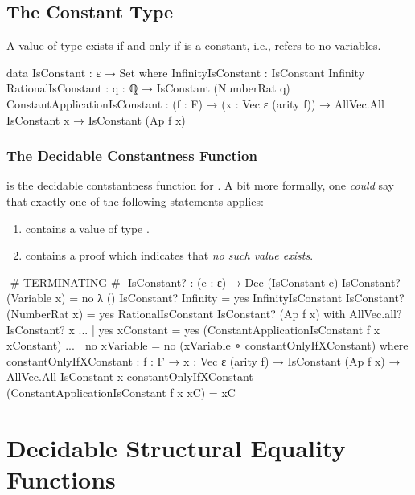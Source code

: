 \documentclass{report}
\begin{document}
\section{The Constant Type}
A value of type   exists if and only if  is a constant, i.e., refers to no variables.

\begin{code}
  data IsConstant : ε → Set where
    InfinityIsConstant : IsConstant Infinity
    RationalIsConstant : {q : ℚ} → IsConstant (NumberRat q)
    ConstantApplicationIsConstant :
      (f : F) →
      (x : Vec ε (arity f)) →
      AllVec.All IsConstant x →
      IsConstant (Ap f x)
\end{code}

\subsection{The Decidable Constantness Function}
 is the decidable contstantness function for .  A bit more formally, one \emph{could} say that exactly one of the following statements applies:

\begin{enumerate}
  \item {}  contains a value of type  .
  \item {}  contains a proof which indicates that \emph{no such value exists}.
\end{enumerate}

\begin{code}
  {-# TERMINATING #-}
  IsConstant? : (e : ε) → Dec (IsConstant e)
  IsConstant? (Variable x) = no λ ()
  IsConstant? Infinity = yes InfinityIsConstant
  IsConstant? (NumberRat x) = yes RationalIsConstant
  IsConstant? (Ap f x) with AllVec.all? IsConstant? x
  ... | yes xConstant = yes (ConstantApplicationIsConstant f x xConstant)
  ... | no xVariable = no (xVariable ∘ constantOnlyIfXConstant)
    where
    constantOnlyIfXConstant :
      {f : F} →
      {x : Vec ε (arity f)} →
      IsConstant (Ap f x) →
      AllVec.All IsConstant x
    constantOnlyIfXConstant (ConstantApplicationIsConstant f x xC) = xC
\end{code}

\chapter{Decidable Structural Equality Functions}
\end{document}
